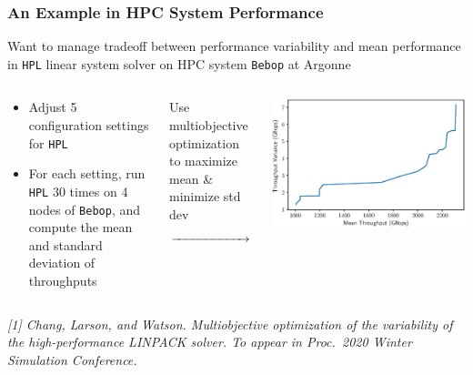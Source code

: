 \documentclass[aspectratio=169]{beamer}
\begin{document}
\begin{frame}\frametitle{An Example in HPC System Performance}
Want to manage tradeoff between performance variability and mean
performance in {\tt HPL} linear system solver on HPC system {\tt Bebop} 
at Argonne
{\small
\begin{columns}
\begin{column}{.3\textwidth}
\begin{itemize}
\item Adjust 5 configuration settings for {\tt HPL}
\item For each setting, run {\tt HPL} 30 times on 4 nodes of {\tt Bebop},
and compute the mean and standard deviation of throughputs
\end{itemize}
\end{column}
\begin{column}{.2\textwidth}
\begin{center}
Use multiobjective optimization to maximize mean
\& minimize std dev
$$\xrightarrow{\hspace*{2cm}}$$
\end{center}
\end{column}
\begin{column}{.4\textwidth}
\includegraphics[width=\textwidth]{../img/moo_old/hpl_n20k_pf.eps}
\end{column}
\end{columns}
}
\medskip
{\tiny\it
[1] Chang, Larson, and Watson.
Multiobjective optimization of the variability of the high-performance 
LINPACK solver.
To appear in Proc.\ 2020 Winter Simulation Conference.\\
}
\end{frame}
\end{document}
